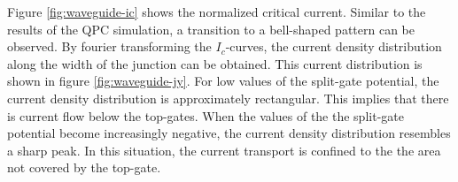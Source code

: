 Figure \ref{fig:waveguide-ic} shows the normalized critical current. Similar to the results of the QPC simulation, a transition to a bell-shaped pattern can be observed. By fourier transforming the $I_c$-curves, the current density distribution along the width of the junction can be obtained. This current distribution is shown in figure \ref{fig:waveguide-jy}. For low values of the split-gate potential, the current density distribution is approximately rectangular. This implies that there is current flow below the top-gates. When the values of the the split-gate potential become increasingly negative, the current density distribution resembles a sharp peak. In this situation, the current transport is confined to the the area not covered by the top-gate.

